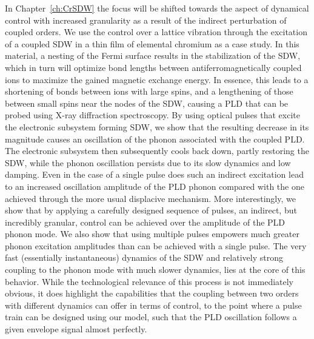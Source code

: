 In Chapter~\ref{ch:CrSDW} the focus will be shifted towards the aspect of dynamical control with increased granularity as a result of the indirect perturbation of coupled orders.
We use the control over a lattice vibration through the excitation of a coupled \gls{SDW} in a thin film of elemental chromium as a case study.
In this material, a nesting of the Fermi surface results in the stabilization of the \gls{SDW}, which in turn will optimize bond lengths between antiferromagnetically coupled ions to maximize the gained magnetic exchange energy.
In essence, this leads to a shortening of bonds between ions with large spins, and a lengthening of those between small spins near the nodes of the \gls{SDW}, causing a \gls{PLD} that can be probed using X-ray diffraction spectroscopy.
By using optical pulses that excite the electronic subsystem forming \gls{SDW}, we show that the resulting  decrease in its magnitude causes an oscillation of the phonon associated with the coupled \gls{PLD}.
The electronic subsystem then subsequently cools back down, partly restoring the \gls{SDW}, while the phonon oscillation persists due to its slow dynamics and low damping.
Even in the case of a single pulse does such an indirect excitation lead to an increased oscillation amplitude of the \gls{PLD} phonon compared with the one achieved through the more usual displacive mechanism.
More interestingly, we show that by applying a carefully designed sequence of pulses, an indirect, but incredibly granular, control can be achieved over the amplitude of the \gls{PLD} phonon mode.
We also show that using multiple pulses empowers much greater phonon excitation amplitudes than can be achieved with a single pulse.
The very fast (essentially instantaneous) dynamics of the \gls{SDW} and relatively strong coupling to the phonon mode with much slower dynamics, lies at the core of this behavior.
While the technological relevance of this process is not immediately obvious, it does highlight the capabilities that the coupling between two orders with different dynamics can offer in terms of control, to the point where a pulse train can be designed using our model, such that the \gls{PLD} oscillation follows a given envelope signal almost perfectly.

